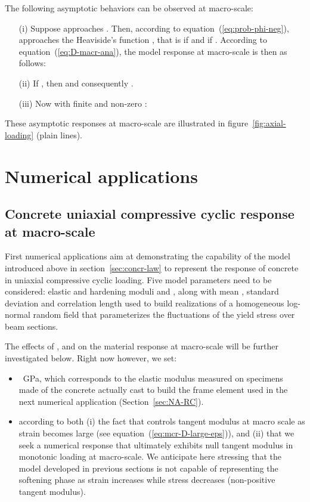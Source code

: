 \documentclass[12p]{amsart}
\begin{document}
The following asymptotic behaviors can be observed at macro-scale:
\begin{itemize}
 \item[(i)] Suppose  approaches . Then, according to equation~(\ref{eq:prob-phi-neg}),  approaches the Heaviside's function , that is  if  and  if . According to equation~(\ref{eq:D-macr-ana}), the model response at macro-scale is then as follows:


 \item[(ii)] If , then  and consequently .

 \item[(iii)] Now with finite and non-zero :
 
 
\end{itemize}
These asymptotic responses at macro-scale are illustrated in figure~\ref{fig:axial-loading} (plain lines).


\section{Numerical applications}\label{sec:NumApplications}
\subsection{Concrete uniaxial compressive cyclic response at macro-scale}\label{sec:uniaxial_finite_length}

First numerical applications aim at demonstrating the capability of the model introduced above in section~\ref{sec:concr-law} to represent the response of concrete in uniaxial compressive cyclic loading. Five model parameters need to be considered: elastic and hardening moduli  and , along with mean , standard deviation  and correlation length  used to build realizations of a homogeneous log-normal random field that parameterizes the fluctuations of the yield stress  over beam sections.

The effects of ,  and  on the material response at macro-scale will be further investigated below. Right now however, we set:
\begin{itemize}
 \item ~GPa, which corresponds to the elastic modulus measured on specimens made of the concrete actually cast to build the frame element used in the next numerical application (Section~\ref{sec:NA-RC}).
 \item  according to both (i) the fact that  controls tangent modulus at macro scale as strain becomes large (see equation~(\ref{eq:mcr-D-large-eps})), and (ii) that we seek a numerical response that ultimately exhibits null tangent modulus in monotonic loading at macro-scale. We anticipate here stressing that the model developed in previous sections is not capable of representing the softening phase as strain increases while stress decreases (non-positive tangent modulus).
\end{itemize}
\end{document}
